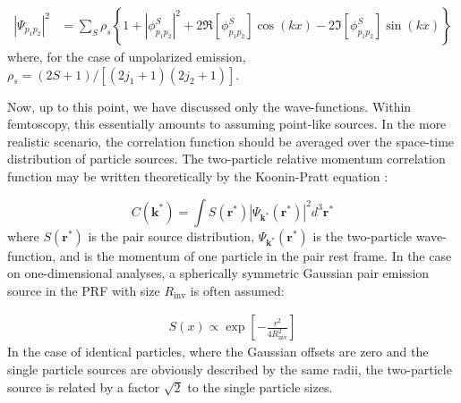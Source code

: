\documentclass[/home/jesse/Analysis/FemtoAnalysis/AnalysisNotes/AnalysisNoteJBuxton.tex]{subfiles}
\begin{document}
\begin{equation}
\begin{aligned}
|\Psi_{p_{1}p_{2}}|^{2} &= \sum_{S}\rho_{s}\left\lbrace 1 + |\phi^{S}_{p_{1}p_{2}}|^{2} + 2\Re[\phi^{S}_{p_{1}p_{2}}]\cos(kx) - 2\Im[\phi^{S}_{p_{1}p_{2}}]\sin(kx) \right\rbrace
\end{aligned}
\label{eqn:IntNonIdPart}
\end{equation}
where, for the case of unpolarized emission, $\rho_{s} = (2S+1)/[(2j_{1}+1)(2j_{2}+1)]$.


Now, up to this point, we have discussed only the wave-functions.
Within femtoscopy, this essentially amounts to assuming point-like sources.
In the more realistic scenario, the correlation function should be averaged over the space-time distribution of particle sources.
The two-particle relative momentum correlation function may be written theoretically by the Koonin-Pratt equation \cite{Koonin:1977fh, Pratt:1990zq}:

\begin{equation}
 C(\mathbf{k^{*}}) = \int S(\mathbf{r^{*}})|\Psi_{\mathbf{k^{*}}}(\mathbf{r^{*}})|^{2}d^{3}\mathbf{r^{*}}
\label{eqn:KooninPrattEqn}
\end{equation}
where $S(\mathbf{r^{*}})$ is the pair source distribution, $\Psi_{\mathbf{k^{*}}}(\mathbf{r^{*}})$ is the two-particle wave-function, and \kstar is the momentum of one particle in the pair rest frame.  
In the case on one-dimensional analyses, a spherically symmetric Gaussian pair emission source in the PRF with size $R_{\mathrm{inv}}$ is often assumed:

\begin{equation}
\begin{aligned}
S(x) \propto \exp\left[ -\frac{r^{2}}{4R_{\mathrm{inv}}^{2}}\right]
\end{aligned}
\label{eqn:Gaussian1D}
\end{equation}
In the case of identical particles, where the Gaussian offsets are zero and the single particle sources are obviously described by the same radii, the two-particle source is related by a factor $\sqrt{2}$ to the single particle sizes. 
\end{document}
